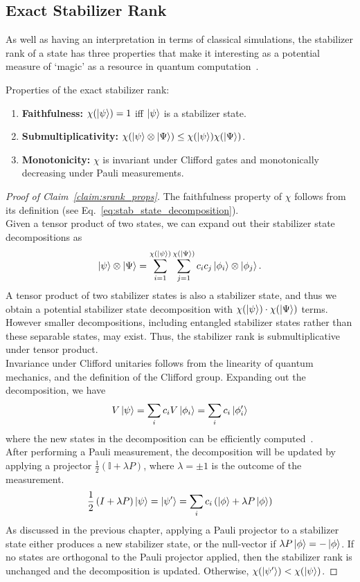 \subsection{Exact Stabilizer Rank}\label{sec:exact_results}
As well as having an interpretation in terms of classical simulations, the stabilizer rank of a state has three properties that make it interesting as a potential measure of `magic' as a resource in quantum computation~\cite{Seddon2019,Howard2017}. 
\begin{cla}
Properties of the exact stabilizer rank:\\
\begin{enumerate}
\item \textbf{Faithfulness:} $\chi(\ket{\psi})=1$ iff $\ket{\psi}$ is a stabilizer state.
\item \textbf{Submultiplicativity:} $\chi(\ket{\psi}\otimes\ket{\Psi})\leq \chi(\ket{\psi})\chi(\ket{\Psi})$.
\item \textbf{Monotonicity:} $\chi$ is invariant under Clifford gates and monotonically decreasing under Pauli measurements.
\end{enumerate}
\label{claim:srank_props}
\end{cla}
\begin{proof}[Proof of Claim~\ref{claim:srank_props}]
The faithfulness property of $\chi$ follows from its definition (see Eq.~\ref{eq:stab_state_decomposition}).\\
Given a tensor product of two states, we can expand out their stabilizer state decompositions as
\[\ket{\psi}\otimes\ket{\Psi}=\sum_{i=1}^{\chi(\ket{\psi})}\sum_{j=1}^{\chi(\ket{\Psi})}c_{i}c_{j}\ket{\phi_{i}}\otimes\ket{\phi_{j}}.\]
A tensor product of two stabilizer states is also a stabilizer state, and thus we obtain a potential stabilizer state decomposition with $\chi(\ket{\psi})\cdot\chi(\ket{\Psi})$ terms. However smaller decompositions, including entangled stabilizer states rather than these separable states, may exist. Thus, the stabilizer rank is submultiplicative under tensor product.\\
Invariance under Clifford unitaries follows from the linearity of quantum mechanics, and the definition of the Clifford group. Expanding out the decomposition, we have
\[V\ket{\psi}=\sum_{i}c_{i}V\ket{\phi_{i}} = \sum_{i}c_{i}\ket{\phi'_{i}}\]
where the new states in the decomposition can be efficiently computed~\cite{Gottesman1998b}.\\
After performing a Pauli measurement, the decomposition will be updated by applying a projector $\frac{1}{2}\left(\mathbb{I}+\lambda P\right)$, where $\lambda=\pm1$ is the outcome of the measurement.
\[\frac{1}{2}\left(I+\lambda P\right)\ket{\psi}=\ket{\psi'}=\sum_{i}c_{i}\left(\ket{\phi}+\lambda P\ket{\phi}\right)\]
As discussed in the previous chapter, applying a Pauli projector to a stabilizer state either produces a new stabilizer state, or the null-vector if $\lambda P\ket{\phi}=-\ket{\phi}$. If no states are orthogonal to the Pauli projector applied, then the stabilizer rank is unchanged and the decomposition is updated. Otherwise, $\chi(\ket{\psi'})<\chi(\ket{\psi})$.
\end{proof}
